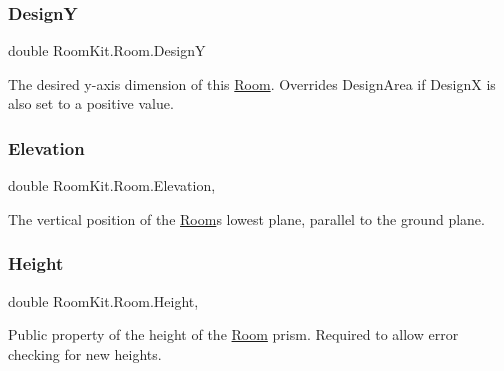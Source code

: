 \mbox{\label{class_room_kit_1_1_room_a7d78915f3033469333b61f59dded4ecd}} 
\subsubsection{\texorpdfstring{DesignY}{DesignY}}
{\footnotesize\ttfamily double Room\+Kit.\+Room.\+DesignY\hspace{0.3cm}{\ttfamily [get]}}



The desired y-\/axis dimension of this \mbox{\hyperlink{class_room_kit_1_1_room}{Room}}. Overrides Design\+Area if DesignX is also set to a positive value. 

\mbox{\label{class_room_kit_1_1_room_a4239b90e74d80b830816970b84494136}} 
\subsubsection{\texorpdfstring{Elevation}{Elevation}}
{\footnotesize\ttfamily double Room\+Kit.\+Room.\+Elevation\hspace{0.3cm}{\ttfamily [get]}, {\ttfamily [set]}}



The vertical position of the \mbox{\hyperlink{class_room_kit_1_1_room}{Room}}\textquotesingle{}s lowest plane, parallel to the ground plane. 

\mbox{\label{class_room_kit_1_1_room_a2e343291f564f8cba532bed978879106}} 
\subsubsection{\texorpdfstring{Height}{Height}}
{\footnotesize\ttfamily double Room\+Kit.\+Room.\+Height\hspace{0.3cm}{\ttfamily [get]}, {\ttfamily [set]}}



Public property of the height of the \mbox{\hyperlink{class_room_kit_1_1_room}{Room}} prism. Required to allow error checking for new heights. 

